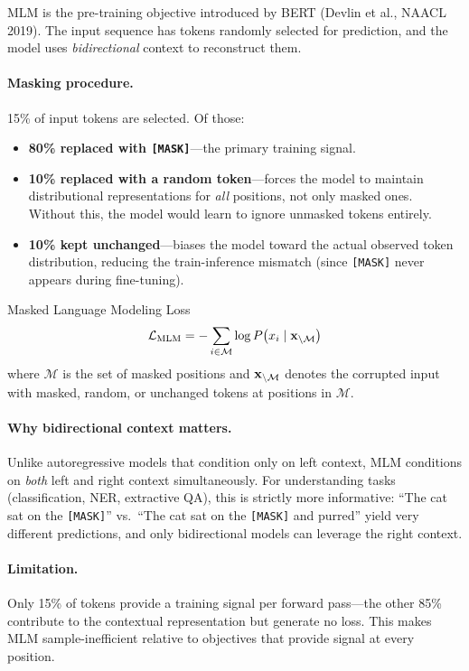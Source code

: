 MLM is the pre-training objective introduced by BERT (Devlin et al., NAACL
2019).  The input sequence has tokens randomly selected for prediction, and
the model uses \emph{bidirectional} context to reconstruct them.

\paragraph{Masking procedure.}
15\% of input tokens are selected.  Of those:
\begin{itemize}
    \item \textbf{80\% replaced with \texttt{[MASK]}}---the primary training
          signal.
    \item \textbf{10\% replaced with a random token}---forces the model to
          maintain distributional representations for \emph{all} positions, not
          only masked ones.  Without this, the model would learn to ignore
          unmasked tokens entirely.
    \item \textbf{10\% kept unchanged}---biases the model toward the actual
          observed token distribution, reducing the train-inference mismatch
          (since \texttt{[MASK]} never appears during fine-tuning).
\end{itemize}

\begin{mathresult}{Masked Language Modeling Loss}
\[
    \mathcal{L}_{\text{MLM}} = - \sum_{i \in \mathcal{M}} \log P\bigl(x_i \mid \mathbf{x}_{\setminus \mathcal{M}}\bigr)
\]
where $\mathcal{M}$ is the set of masked positions and $\mathbf{x}_{\setminus \mathcal{M}}$
denotes the corrupted input with masked, random, or unchanged tokens at positions in
$\mathcal{M}$.
\end{mathresult}

\paragraph{Why bidirectional context matters.}
Unlike autoregressive models that condition only on left context, MLM conditions
on \emph{both} left and right context simultaneously.  For understanding tasks
(classification, NER, extractive QA), this is strictly more informative:
``The cat sat on the \texttt{[MASK]}'' vs.\ ``The cat sat on the
\texttt{[MASK]} and purred'' yield very different predictions, and only
bidirectional models can leverage the right context.

\paragraph{Limitation.}
Only 15\% of tokens provide a training signal per forward pass---the other
85\% contribute to the contextual representation but generate no loss.  This
makes MLM sample-inefficient relative to objectives that provide signal at
every position.


